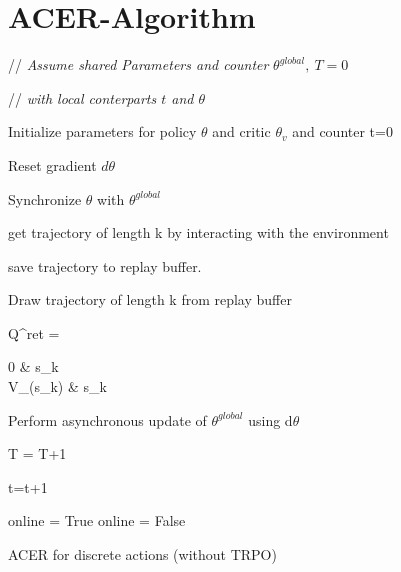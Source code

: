 \appendix
\section{ACER-Algorithm}
\label{appendixA}
\begin{algorithm}[h]
{
// \textit{ Assume shared Parameters and counter} $ \theta^{global} ,\ T = 0 $

// \textit{ with local conterparts $t$ and $\theta$ }

 Initialize parameters for policy $\theta$ and critic $\theta_v$ and counter t=0
 
 {
  Reset gradient $d\theta $
  
 {
 Synchronize $ \theta $ with $\theta^{global} $
 
 get trajectory of length k by interacting with the environment
 
  save trajectory to replay buffer. 
 }
 
 \Else
 {Draw trajectory of length k from replay buffer}
 
 Q^{ret} = \begin{cases} 
 0 &  s_k  \\
 V_{\theta}(s_k) & s_k 
 \end{cases} %
 
 Perform asynchronous update of $\theta^{global}$ using d$\theta$
 
 T = T+1
 
 t=t+1

 {
 online = True
 } 
 \Else
{online = False}
}
}
\label{ACERALGO}
 \caption{ACER for discrete actions (without TRPO) \citep{ACER}}
\end{algorithm}
